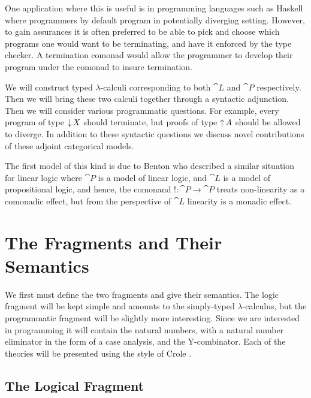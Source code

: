 One application where this is useful is in programming languages such
as Haskell where programmers by default program in potentially
diverging setting.  However, to gain assurances it is often preferred
to be able to pick and choose which programs one would want to be
terminating, and have it enforced by the type checker.  A termination
comonad would allow the programmer to develop their program under the
comonad to insure termination.

We will construct typed $\lambda$-calculi corresponding to both
$\cat{L}$ and $\cat{P}$ respectively.  Then we will bring these two
calculi together through a syntactic adjunction.  Then we will
consider various programmatic questions.  For example, every program
of type $\mathop{\downarrow} X$ should terminate, but proofs of type $\mathop{\uparrow} A$ should
be allowed to diverge.  In addition to these syntactic questions we
discuss novel contributions of these adjoint categorical models.

The first model of this kind is due to Benton \cite{??} who described
a similar situation for linear logic where $\cat{P}$ is a model of
linear logic, and $\cat{L}$ is a model of propositional logic, and
hence, the comonand $! : \cat{P} \to \cat{P}$ treats non-linearity as
a comonadic effect, but from the perspective of $\cat{L}$ linearity is
a monadic effect.  

\section{The Fragments and Their Semantics}
\label{sec:the_fragments_and_their_semantics}

We first must define the two fragments and give their semantics.  The
logic fragment will be kept simple and amounts to the simply-typed
$\lambda$-calculus, but the programmatic fragment will be slightly
more interesting.  Since we are interested in programming it will
contain the natural numbers, with a natural number eliminator in the
form of a case analysis, and the Y-combinator.  Each of the theories
will be presented using the style of Crole \cite{??}.

\subsection{The Logical Fragment}
\label{subsec:the_logical_fragment}

